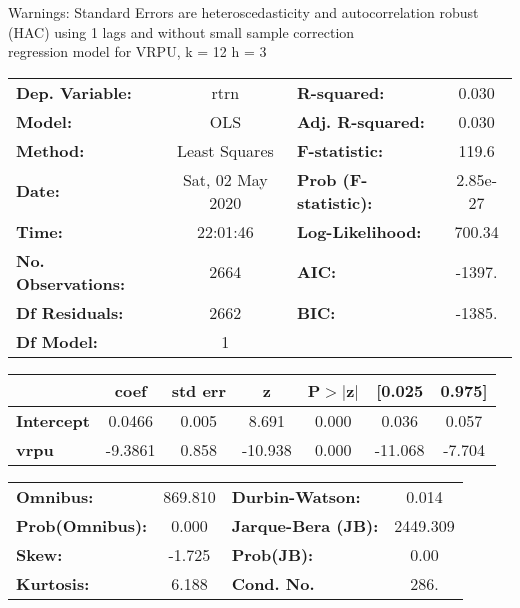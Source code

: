 Warnings: \newline
 [1] Standard Errors are heteroscedasticity and autocorrelation robust (HAC) using 1 lags and without small sample correction\\ 

regression model for VRPU, k = 12 h = 3\begin{center}
\begin{tabular}{lclc}
\toprule
\textbf{Dep. Variable:}    &       rtrn       & \textbf{  R-squared:         } &     0.030   \\
\textbf{Model:}            &       OLS        & \textbf{  Adj. R-squared:    } &     0.030   \\
\textbf{Method:}           &  Least Squares   & \textbf{  F-statistic:       } &     119.6   \\
\textbf{Date:}             & Sat, 02 May 2020 & \textbf{  Prob (F-statistic):} &  2.85e-27   \\
\textbf{Time:}             &     22:01:46     & \textbf{  Log-Likelihood:    } &    700.34   \\
\textbf{No. Observations:} &        2664      & \textbf{  AIC:               } &    -1397.   \\
\textbf{Df Residuals:}     &        2662      & \textbf{  BIC:               } &    -1385.   \\
\textbf{Df Model:}         &           1      & \textbf{                     } &             \\
\bottomrule
\end{tabular}
\begin{tabular}{lcccccc}
                   & \textbf{coef} & \textbf{std err} & \textbf{z} & \textbf{P$> |$z$|$} & \textbf{[0.025} & \textbf{0.975]}  \\
\midrule
\textbf{Intercept} &       0.0466  &        0.005     &     8.691  &         0.000        &        0.036    &        0.057     \\
\textbf{vrpu}      &      -9.3861  &        0.858     &   -10.938  &         0.000        &      -11.068    &       -7.704     \\
\bottomrule
\end{tabular}
\begin{tabular}{lclc}
\textbf{Omnibus:}       & 869.810 & \textbf{  Durbin-Watson:     } &    0.014  \\
\textbf{Prob(Omnibus):} &   0.000 & \textbf{  Jarque-Bera (JB):  } & 2449.309  \\
\textbf{Skew:}          &  -1.725 & \textbf{  Prob(JB):          } &     0.00  \\
\textbf{Kurtosis:}      &   6.188 & \textbf{  Cond. No.          } &     286.  \\
\bottomrule
\end{tabular}
\end{center}


